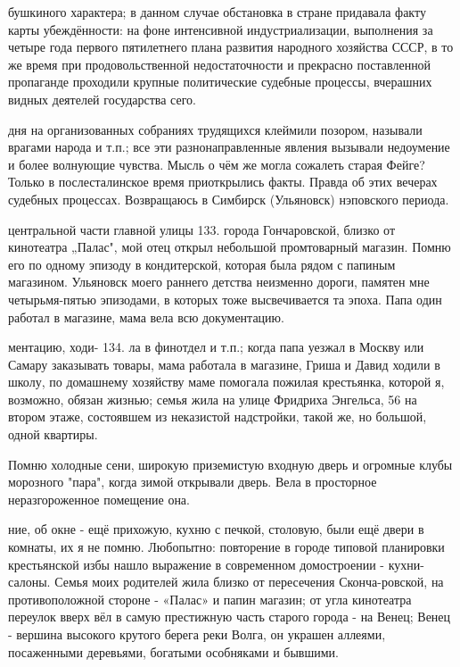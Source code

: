 \label{131-1}
бушкиного характера; в данном случае обстановка в стране придавала факту карты убеждённости: на фоне интенсивной индустриализации, выполнения за четыре года первого пятилетнего плана развития народного хозяйства СССР, в то же время при продовольственной недостаточности и прекрасно поставленной пропаганде проходили крупные политические судебные процессы, вчерашних видных деятелей государства сего.

\label{132-1}
дня на организованных собраниях трудящихся клеймили позором, называли врагами народа и т.п.; все эти разнонаправленные явления вызывали недоумение и более волнующие чувства. Мысль о чём же могла сожалеть старая Фейге? Только в послесталинское время приоткрылись факты. Правда об этих вечерах судебных процессах. Возвращаюсь в Симбирск (Ульяновск) нэповского периода.

\label{133-1}
центральной части главной улицы 133. города Гончаровской, близко от кинотеатра „Палас", мой отец открыл небольшой промтоварный магазин. Помню его по одному эпизоду в кондитерской, которая была рядом с папиным магазином. Ульяновск моего раннего детства неизменно дороги, памятен мне четырьмя-пятью эпизодами, в которых тоже высвечивается та эпоха. Папа один работал в магазине, мама вела всю документацию.

\label{134-1}
ментацию, ходи- 134. ла в финотдел и т.п.; когда папа уезжал в Москву или Самару заказывать товары, мама работала в магазине, Гриша и Давид ходили в школу, по домашнему хозяйству маме помогала пожилая крестьянка, которой я, возможно, обязан жизнью; семья жила на улице Фридриха Энгельса, 56 на втором этаже, состоявшем из неказистой надстройки, такой же, но большой, одной квартиры.

Помню холодные сени, широкую приземистую входную дверь и огромные клубы морозного "пара", когда зимой открывали дверь. Вела в просторное неразгороженное помещение она.

\label{135-1}
ние, об окне - ещё прихожую, кухню с печкой, столовую, были ещё двери в комнаты, их я не помню. Любопытно: повторение в городе типовой планировки крестьянской избы нашло выражение в современном домостроении - кухни-салоны. Семья моих родителей жила близко от пересечения Сконча-ровской, на противоположной стороне - «Палас» и папин магазин; от угла кинотеатра переулок вверх вёл в самую престижную часть старого города - на Венец; Венец - вершина высокого крутого берега реки Волга, он украшен аллеями, посаженными деревьями, богатыми особняками и бывшими.

